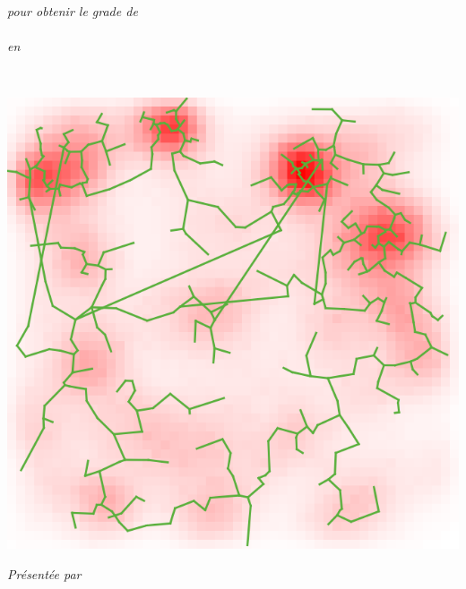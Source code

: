 
\begin{titlepage}

\begin{addmargin}[-1cm]{-3cm}
\begin{center}
\large

\hfill
\vfill

\begingroup
{}\\
\textit{pour obtenir le grade de}\\
\\
\textit{en }\\\vspace{1cm}
\endgroup

\vfill

\begingroup
\color{Maroon}\spacedallcaps{\myTitle} \\ \bigskip %
\endgroup

\vfill

\includegraphics[width=\textwidth]{Figures/Cover/cover} \\ \vspace{0.5cm} %

\textit{Présentée par}\\
\spacedlowsmallcaps{\myName}\\ %
\bigskip



\end{center}
\end{addmargin}
\end{titlepage}
